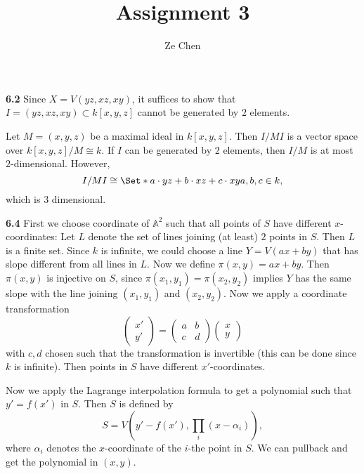 \documentclass{article}
\title{Assignment 3}
\author{Ze Chen}
\makeatletter
\newcommand*{\shifttext}[1]{%
  \settowidth{\@tempdima}{#1}%
  \hspace{-\@tempdima}#1%
}
\newcommand{\plabel}[1]{%
\shifttext{\textbf{#1}\quad}%
}
\makeatother
\begin{document}
\maketitle

\plabel{6.2}%
Since $X = V(yz, xz, xy)$, it suffices to show that $I = (yz,xz,xy) \subset k[x,y,z]$ cannot be generated by $2$ elements.
\par
Let $M = (x,y,z)$ be a maximal ideal in $k[x,y,z]$.
Then $I/MI$ is a vector space over $k[x,y,z]/M \cong k$.
If $I$ can be generated by $2$ elements, then $I/M$ is at most $2$-dimensional.
However, 
\[ I/MI \cong \Set*{a \cdot yz + b \cdot xz + c \cdot xy}{a,b,c\in k}, \]
which is $3$ dimensional.

\plabel{6.4}%
First we choose coordinate of $\mathbb{A}^2$ such that all points of $S$ have different $x$-coordinates:
Let $L$ denote the set of lines joining (at least) $2$ points in $S$.
Then $L$ is a finite set.
Since $k$ is infinite, we could choose a line $Y = V(ax+by)$ that has slope different from all lines in $L$.
Now we define $\pi(x,y) = ax+by$.
Then $\pi(x,y)$ is injective on $S$, since $\pi(x_1,y_1) = \pi(x_2,y_2)$ implies $Y$ has the same slope with the line joining $(x_1,y_1)$ and $(x_2,y_2)$.
Now we apply a coordinate transformation
\[ \begin{pmatrix}
    x' \\ y'
\end{pmatrix} = \begin{pmatrix}
    a & b \\ c & d
\end{pmatrix} \begin{pmatrix}
    x \\ y
\end{pmatrix} \]
with $c,d$ chosen such that the transformation is invertible (this can be done since $k$ is infinite).
Then points in $S$ have different $x'$-coordinates.

\par
Now we apply the Lagrange interpolation formula to get a polynomial such that $y' = f(x')$ in $S$.
Then $S$ is defined by
\[ S = V(y'-f(x'), \prod_i(x-\alpha_i)), \]
where $\alpha_i$ denotes the $x$-coordinate of the $i$-the point in $S$.
We can pullback and get the polynomial in $(x,y)$.
\end{document}

